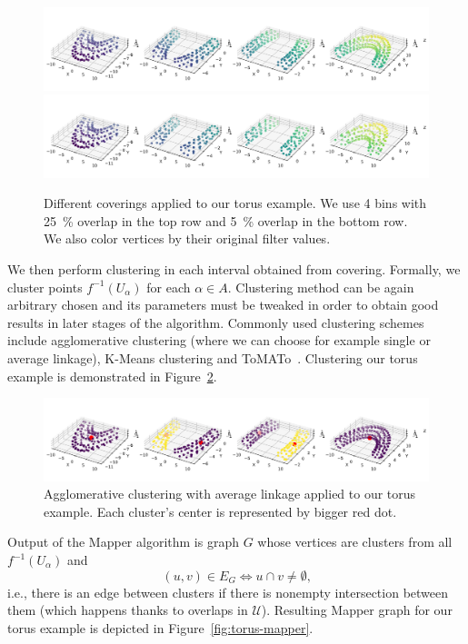 \documentclass{article}
\begin{document}
\begin{figure}[ht]
    \centering
    \includegraphics[width=0.9\columnwidth]{torus-partition-4-25}
    \includegraphics[width=0.9\columnwidth]{torus-partition-4-05}
    \caption{Different coverings applied to our torus example.
        We use 4 bins with 25~\% overlap in the top row and 5~\% overlap in the bottom row.
        We also color vertices by their original filter values.}
    \label{fig:torus-cover}
\end{figure}

We then perform clustering in each interval obtained from covering.
Formally, we cluster points $f^{-1}(U_\alpha)$ for each $\alpha \in A$.
Clustering method can be again arbitrary chosen and its parameters must be tweaked in order to obtain good results in later stages of the algorithm.
Commonly used clustering schemes include agglomerative clustering (where we can choose for example single or average linkage), K-Means clustering and ToMATo~\cite{tomato}.
Clustering our torus example is demonstrated in Figure~\ref{fig:torus-cluster}.

\begin{figure}[ht]
    \centering
    \includegraphics[width=0.9\columnwidth]{torus-clustering}
    \caption{Agglomerative clustering with average linkage applied to our torus example.
        Each cluster's center is represented by bigger red dot.}
    \label{fig:torus-cluster}
\end{figure}

Output of the Mapper algorithm is graph $G$ whose vertices are clusters from all $f^{-1}(U_\alpha)$ and
$$
    (u, v) \in E_G \Leftrightarrow u \cap v \neq \emptyset \mbox{,}
$$
i.e., there is an edge between clusters if there is nonempty intersection between them (which happens thanks to overlaps in $\mathcal{U}$).
Resulting Mapper graph for our torus example is depicted in Figure~\ref{fig:torus-mapper}.
\end{document}
